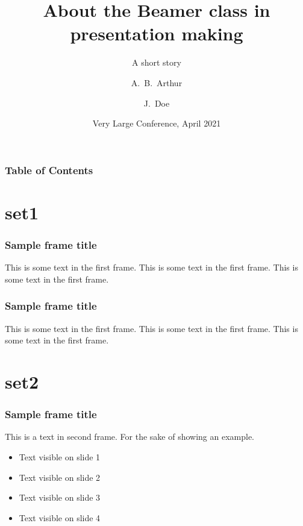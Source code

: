 \documentclass{beamer}
\title[About Beamer] %
{About the Beamer class in presentation making}
\subtitle{A short story}
\author[Arthur, Doe] %
{A.~B.~Arthur\inst{1} \and J.~Doe\inst{2}}
\institute[VFU] %
{
	\inst{1}%
	Faculty of Physics\\
	Very Famous University
	\and
	\inst{2}%
	Faculty of Chemistry\\
	Very Famous University
}
\date[VLC 2021] %
{Very Large Conference, April 2021}
\begin{document}
	
	
	\frame{\titlepage}
	\begin{frame}
		\frametitle{Table of Contents}
		\tableofcontents
	\end{frame}
	\section{set1}
	\begin{frame}
		\frametitle{Sample frame title}
		This is some text in the first frame. This is some text in the first frame. This is some text in the first frame.
	\end{frame}

\begin{frame}
	\frametitle{Sample frame title}
	This is some text in the first frame. This is some text in the first frame. This is some text in the first frame.
\end{frame}
\section{set2}
\begin{frame}
	\frametitle{Sample frame title}
	This is a text in second frame. 
	For the sake of showing an example.
	
	\begin{itemize}
		\item<1-> Text visible on slide 1
		\item<2-> Text visible on slide 2
		\item<3> Text visible on slide 3
		\item<4-> Text visible on slide 4
	\end{itemize}
\end{frame}
\end{document}

